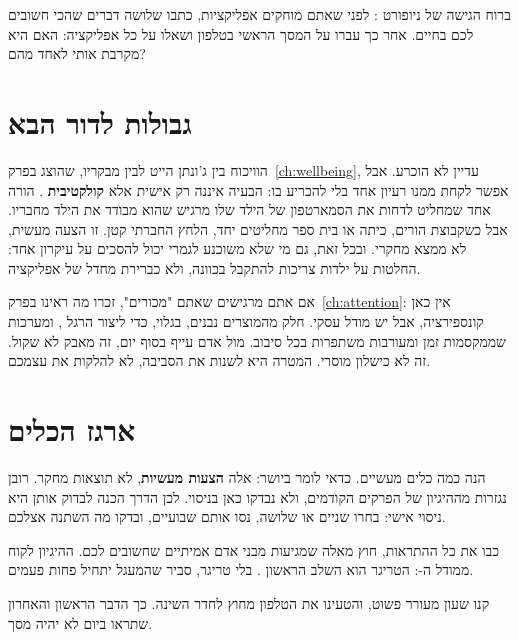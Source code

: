 \begin{tipbox}
ברוח הגישה של ניופורט \parencite{newport2019}: לפני שאתם מוחקים אפליקציות, כתבו שלושה דברים שהכי חשובים לכם בחיים. אחר כך עברו על המסך הראשי בטלפון ושאלו על כל אפליקציה: האם היא מקרבת אותי לאחד מהם?
\end{tipbox}

\section{גבולות לדור הבא}

הוויכוח בין ג'ונתן הייט לבין מבקריו, שהוצג בפרק~\ref{ch:wellbeing}, עדיין לא הוכרע. אבל אפשר לקחת ממנו רעיון אחד בלי להכריע בו: הבעיה איננה רק אישית אלא \textbf{קולקטיבית} \parencite{haidt2024}. הורה אחד שמחליט לדחות את הסמארטפון של הילד שלו מרגיש שהוא מבודד את הילד מחבריו. אבל כשקבוצת הורים, כיתה או בית ספר מחליטים יחד, הלחץ החברתי קטן. זו הצעה מעשית, לא ממצא מחקרי. ובכל זאת, גם מי שלא משוכנע לגמרי יכול להסכים על עיקרון אחד: החלטות על ילדות צריכות להתקבל בכוונה, ולא כברירת מחדל של אפליקציה.

\begin{alertbox}
אם אתם מרגישים שאתם "מכורים", זכרו מה ראינו בפרק~\ref{ch:attention}: אין כאן קונספירציה, אבל יש מודל עסקי. חלק מהמוצרים נבנים, בגלוי, כדי ליצור הרגל \parencite{eyal2014}, ומערכות שממקסמות זמן ומעורבות משתפרות בכל סיבוב. מול אדם עייף בסוף יום, זה מאבק לא שקול. זה לא כישלון מוסרי. המטרה היא לשנות את הסביבה, לא להלקות את עצמכם.
\end{alertbox}

\section{ארגז הכלים}

הנה כמה כלים מעשיים. כדאי לומר ביושר: אלה \textbf{הצעות מעשיות}, לא תוצאות מחקר. רובן נגזרות מההיגיון של הפרקים הקודמים, ולא נבדקו כאן בניסוי. לכן הדרך הכנה לבדוק אותן היא ניסוי אישי: בחרו שניים או שלושה, נסו אותם שבועיים, ובדקו מה השתנה אצלכם.

\begin{tipbox}
כבו את כל ההתראות, חוץ מאלה שמגיעות מבני אדם אמיתיים שחשובים לכם. ההיגיון לקוח ממודל ה-: הטריגר הוא השלב הראשון \parencite{eyal2014}. בלי טריגר, סביר שהמעגל יתחיל פחות פעמים.
\end{tipbox}

\begin{tipbox}
קנו שעון מעורר פשוט, והטעינו את הטלפון מחוץ לחדר השינה. כך הדבר הראשון והאחרון שתראו ביום לא יהיה מסך.
\end{tipbox}

